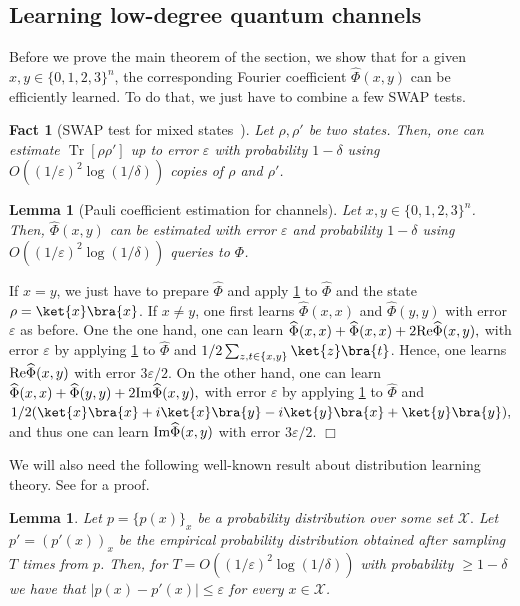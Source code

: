 \documentclass[11pt]{article}
\newcommand{\eps}{\varepsilon}
\theoremstyle{plain}
\newtheorem{lemma}[theorem]{Lemma}
\newtheorem{fact}[theorem]{Fact}
\renewcommand{\Re}{\mbox{\rm Re}}
\renewcommand{\Im}{\mbox{\rm Im}}
\DeclareMathOperator{\Tr}{Tr}
\theoremstyle{plain}
\theoremstyle{definition}
\theoremstyle{remark}
\renewenvironment{proof}[1][]{
    \begin{trivlist}
    \item[\hspace{\labelsep}{\em\noindent Proof#1:\/}]}
    {{\hfill$\Box$}
    \end{trivlist}
}
\theoremstyle{named}
\begin{document}
\subsection{Learning low-degree quantum channels}
Before we prove the main theorem of the section, we show that for a given $x,y\in \{0,1,2,3\}^n$, the corresponding Fourier coefficient $\widehat\Phi(x,y)$ can be efficiently learned. To do that, we just have to combine a few SWAP tests.
\begin{fact}[SWAP test for mixed states~\cite{kobayashi2003quantum}]\label{lem:mixedSWAPTest}
    Let $\rho, \rho'$ be two states. Then, one can estimate $\Tr[\rho\rho']$ up to error $\eps$ with probability $1-\delta$ using $O((1/\eps)^{2}\log(1/\delta))$ copies of $\rho$ and $\rho'$.
\end{fact}

\begin{lemma}[Pauli coefficient estimation for channels]\label{cor:PauliCoefficientEstimationChannel}
    Let $x,y\in \{0,1,2,3\}^n$. Then, $\widehat \Phi(x,y)$ can be estimated with error $\eps$ and probability $1-\delta$ using $O((1/\eps)^{2}\log(1/\delta))$ queries to $\Phi$. 
\end{lemma}




\begin{proof}
    If $x=y$, we just have to prepare $\widehat\Phi$ and apply \cref{lem:mixedSWAPTest} to $\widehat\Phi$ and the state $\rho=\ket{x}\bra{x}$. If $x\neq y$, one first learns $\widehat\Phi(x,x)$ and $\widehat\Phi(y,y)$ with error $\eps$ as before. One the one hand, one can learn $\widehat\Phi(x,x)+\widehat\Phi(x,x)+2\Re \widehat\Phi(x,y),$ with error $\eps$ by applying \cref{lem:mixedSWAPTest} to $\widehat\Phi$ and $1/2\sum_{z,t\in\{x,y\}}\ket{z}\bra{t}$. Hence, one learns $\Re\widehat\Phi(x,y)$ with error $3\eps/2$. On the other hand, one can learn $\widehat\Phi(x,x)+\widehat\Phi(y,y)+2\Im \widehat\Phi(x,y),$ with error $\eps$ by applying \cref{lem:mixedSWAPTest} to $\widehat\Phi$ and $1/2(\ket{x}\bra{x}+i\ket{x}\bra{y}-i\ket{y}\bra{x}+\ket{y}\bra{y}),$ and thus one can learn $\Im \widehat\Phi(x,y)$ with error $3\eps/2$. 
\end{proof}
We will also need the following well-known result about distribution learning theory. See \cite[Theorem 9]{canonne2020short} for a proof.
\begin{lemma}\label{lem:LearningDiscreteProb}
    Let $p=\{p(x)\}_x$ be a probability distribution over some set $\mathcal{X}.$ Let $p'=( p'(x))_x$ be the empirical probability distribution obtained after sampling $T$ times from $p$. Then, for $T=O((1/\eps)^2\log(1/\delta))$  with probability $\geq 1-\delta$  we have that $|p(x)- p'(x)|\leq \eps$ for every $x\in\mathcal X$.
\end{lemma}
\end{document}
